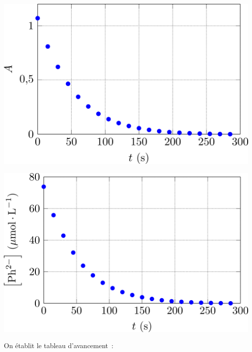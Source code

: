 \documentclass[../../main/main.tex]{subfiles}
\begin{document}
\begin{minipage}{0.49\linewidth}
	\begin{center}
		\includegraphics[width=\linewidth]{ph_evol-a}
	\end{center}
\end{minipage}
\begin{minipage}{0.49\linewidth}
	\begin{center}
		\includegraphics[width=\linewidth]{ph_evol-b}
	\end{center}
\end{minipage}

On établit le tableau d'avancement~:
\end{document}
